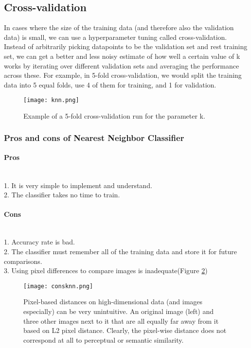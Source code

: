 \subsection{Cross-validation}
In cases where the size of the training data (and therefore also the validation data) is small, we can use a hyperparameter tuning called cross-validation. Instead of arbitrarily picking datapoints to be the validation set and rest training set, we can get a better and less noisy estimate of how well a certain value of k works by iterating over different validation sets and averaging the performance across these. For example, in 5-fold cross-validation, we would split the training data into 5 equal folds, use 4 of them for training, and 1 for validation.
\begin{figure}[h!]
  \centering
  \texttt{[image: knn.png]}
  \label{fig2}
  \caption{Example of a 5-fold cross-validation run for the parameter k.}
\end{figure}

\subsubsection{Pros and cons of Nearest Neighbor Classifier}
\paragraph{Pros}
\leavevmode \\
1. It is very simple to implement and understand.
\leavevmode \\
2.  The classifier takes no time to train.
\paragraph{Cons}
\leavevmode \\
1. Accuracy rate is bad. 
\\
2. The classifier must remember all of the training data and store it for future comparisons.
\\
3. Using pixel differences to compare images is inadequate(Figure \ref{fig3})

\begin{figure}[h!]
  \centering
  \texttt{[image: consknn.png]}
  \caption{Pixel-based distances on high-dimensional data (and images especially) can be very unintuitive. An original image (left) and three other images next to it that are all equally far away from it based on L2 pixel distance. Clearly, the pixel-wise distance does not correspond at all to perceptual or semantic similarity.}
  \label{fig3}
\end{figure}


